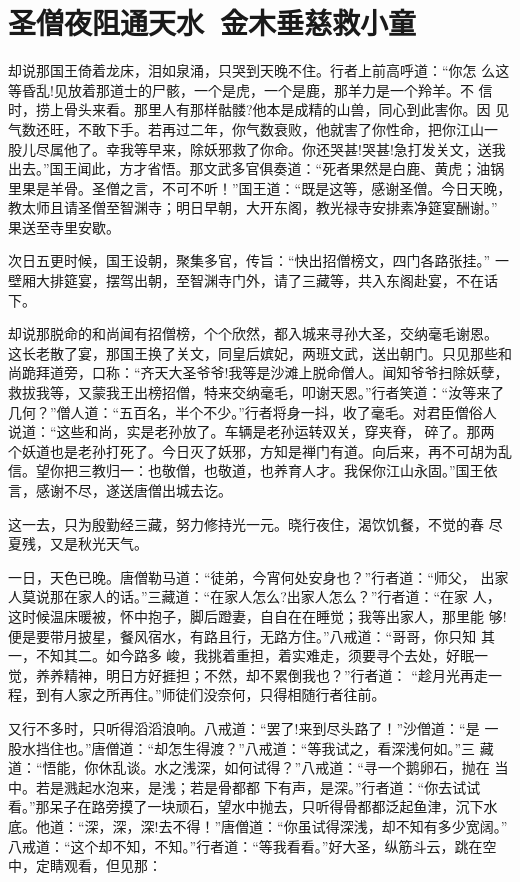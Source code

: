 \chapter{圣僧夜阻通天水~金木垂慈救小童}

却说那国王倚着龙床，泪如泉涌，只哭到天晚不住。行者上前高呼道：“你怎
么这等昏乱!见放着那道士的尸骸，一个是虎，一个是鹿，那羊力是一个羚羊。不
信时，捞上骨头来看。那里人有那样骷髅?他本是成精的山兽，同心到此害你。因
见气数还旺，不敢下手。若再过二年，你气数衰败，他就害了你性命，把你江山一
股儿尽属他了。幸我等早来，除妖邪救了你命。你还哭甚!哭甚!急打发关文，送我
出去。”国王闻此，方才省悟。那文武多官俱奏道：“死者果然是白鹿、黄虎；油锅
里果是羊骨。圣僧之言，不可不听！”国王道：“既是这等，感谢圣僧。今日天晚，
教太师且请圣僧至智渊寺；明日早朝，大开东阁，教光禄寺安排素净筵宴酬谢。”
果送至寺里安歇。

次日五更时候，国王设朝，聚集多官，传旨：“快出招僧榜文，四门各路张挂。”
一壁厢大排筵宴，摆驾出朝，至智渊寺门外，请了三藏等，共入东阁赴宴，不在话
下。

却说那脱命的和尚闻有招僧榜，个个欣然，都入城来寻孙大圣，交纳毫毛谢恩。
这长老散了宴，那国王换了关文，同皇后嫔妃，两班文武，送出朝门。只见那些和
尚跪拜道旁，口称：“齐天大圣爷爷!我等是沙滩上脱命僧人。闻知爷爷扫除妖孽，
救拔我等，又蒙我王出榜招僧，特来交纳毫毛，叩谢天恩。”行者笑道：“汝等来了
几何？”僧人道：“五百名，半个不少。”行者将身一抖，收了毫毛。对君臣僧俗人
说道：“这些和尚，实是老孙放了。车辆是老孙运转双关，穿夹脊，碎了。那两
个妖道也是老孙打死了。今日灭了妖邪，方知是禅门有道。向后来，再不可胡为乱
信。望你把三教归一：也敬僧，也敬道，也养育人才。我保你江山永固。”国王依
言，感谢不尽，遂送唐僧出城去讫。

这一去，只为殷勤经三藏，努力修持光一元。晓行夜住，渴饮饥餐，不觉的春
尽夏残，又是秋光天气。

一日，天色已晚。唐僧勒马道：“徒弟，今宵何处安身也？”行者道：“师父，
出家人莫说那在家人的话。”三藏道：“在家人怎么?出家人怎么？”行者道：“在家
人，这时候温床暖被，怀中抱子，脚后蹬妻，自自在在睡觉；我等出家人，那里能
够!便是要带月披星，餐风宿水，有路且行，无路方住。”八戒道：“哥哥，你只知
其一，不知其二。如今路多峻，我挑着重担，着实难走，须要寻个去处，好眠一
觉，养养精神，明日方好捱担；不然，却不累倒我也？”行者道：
“趁月光再走一程，到有人家之所再住。”师徒们没奈何，只得相随行者往前。

又行不多时，只听得滔滔浪响。八戒道：“罢了!来到尽头路了！”沙僧道：“是
一股水挡住也。”唐僧道：“却怎生得渡？”八戒道：“等我试之，看深浅何如。”三
藏道：“悟能，你休乱谈。水之浅深，如何试得？”八戒道：“寻一个鹅卵石，抛在
当中。若是溅起水泡来，是浅；若是骨都都下有声，是深。”行者道：“你去试试
看。”那呆子在路旁摸了一块顽石，望水中抛去，只听得骨都都泛起鱼津，沉下水
底。他道：“深，深，深!去不得！”唐僧道：“你虽试得深浅，却不知有多少宽阔。”
八戒道：“这个却不知，不知。”行者道：“等我看看。”好大圣，纵筋斗云，跳在空
中，定睛观看，但见那：

